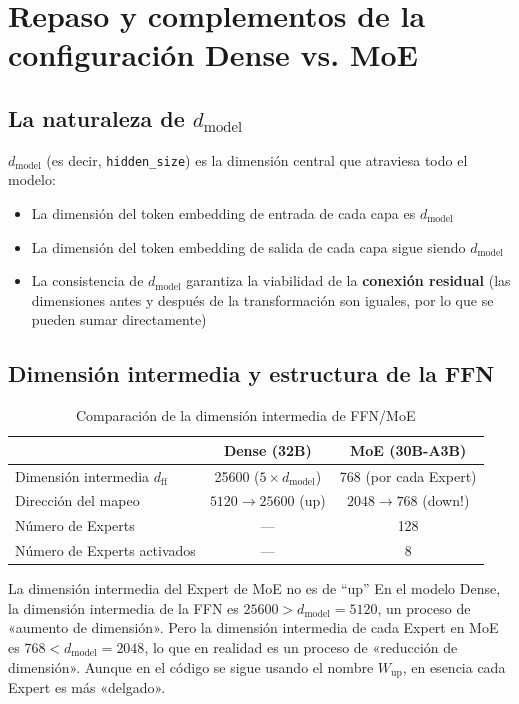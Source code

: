 \section{Repaso y complementos de la configuración Dense vs. MoE}

\subsection{La naturaleza de $d_{\text{model}}$}

$d_{\text{model}}$ (es decir, \texttt{hidden\_size}) es la dimensión central que atraviesa todo el modelo:
\begin{itemize}
  \item La dimensión del token embedding de entrada de cada capa es $d_{\text{model}}$
  \item La dimensión del token embedding de salida de cada capa sigue siendo $d_{\text{model}}$
  \item La consistencia de $d_{\text{model}}$ garantiza la viabilidad de la \textbf{conexión residual} (las dimensiones antes y después de la transformación son iguales, por lo que se pueden sumar directamente)
\end{itemize}

\subsection{Dimensión intermedia y estructura de la FFN}

\begin{table}[H]
\centering
\caption{Comparación de la dimensión intermedia de FFN/MoE}
\begin{tabular}{lcc}
\toprule
& \textbf{Dense (32B)} & \textbf{MoE (30B-A3B)} \\
\midrule
Dimensión intermedia $d_{\text{ff}}$ & 25600 ($5 \times d_{\text{model}}$) & 768 (por cada Expert) \\
Dirección del mapeo & $5120 \to 25600$ (up) & $2048 \to 768$ (down!) \\
Número de Experts & --- & 128 \\
Número de Experts activados & --- & 8 \\
\bottomrule
\end{tabular}
\end{table}

\begin{warningbox}{La dimensión intermedia del Expert de MoE no es de ``up''}
En el modelo Dense, la dimensión intermedia de la FFN es $25600 > d_{\text{model}} = 5120$, un proceso de «aumento de dimensión». Pero la dimensión intermedia de cada Expert en MoE es $768 < d_{\text{model}} = 2048$, lo que en realidad es un proceso de «reducción de dimensión». Aunque en el código se sigue usando el nombre $W_{\text{up}}$, en esencia cada Expert es más «delgado».
\end{warningbox}

